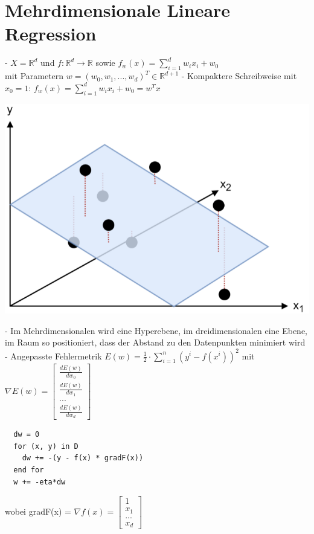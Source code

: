 \documentclass{report}
\begin{document}
\section{Mehrdimensionale Lineare Regression}
- $X = \mathbb{R}^d$ und $f: \mathbb{R}^d \rightarrow \mathbb{R}$ sowie $f_w(x) = \sum_{i=1}^dw_ix_i + w_0$\\
mit Parametern $w = (w_0, w_1, ..., w_d)^T \in \mathbb{R}^{d + 1}$
- Kompaktere Schreibweise mit $x_0 = 1$: $f_w(x) = \sum_{i = 1}^dw_ix_i + w_0 = w^Tx$\\
\begin{center}
  \includegraphics[scale=.25]{ml02_4}
\end{center}
- Im Mehrdimensionalen wird eine Hyperebene, im dreidimensionalen eine Ebene, im Raum so positioniert, dass der Abstand zu den Datenpunkten minimiert wird\\
- Angepasste Fehlermetrik $E(w) = \frac{1}{2}\cdot \sum_{i=1}^n(y^i - f(x^i))^2$
mit $\nabla E(w) = \begin{bmatrix}\frac{dE(w)}{dw_0}\\\frac{dE(w)}{dw_1}\\...\\\frac{dE(w)}{dw_d}\end{bmatrix}$\\
\begin{lstlisting}
  dw = 0
  for (x, y) in D
    dw += -(y - f(x) * gradF(x))
  end for
  w += -eta*dw
\end{lstlisting}
wobei gradF(x) = $\nabla f(x) = \begin{bmatrix}1\\x_1\\...\\x_d\end{bmatrix}$\\
\end{document}
